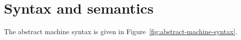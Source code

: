 \documentclass[12pt,phd,lfcs,twoside,openright,logo,leftchapter,normalheadings]{infthesis}
\theoremstyle{plain}
\theoremstyle{definition}
\begin{document}
\section{Syntax and semantics}
The abstract machine syntax is given in
Figure~\ref{fig:abstract-machine-syntax}.
%
\end{document}
